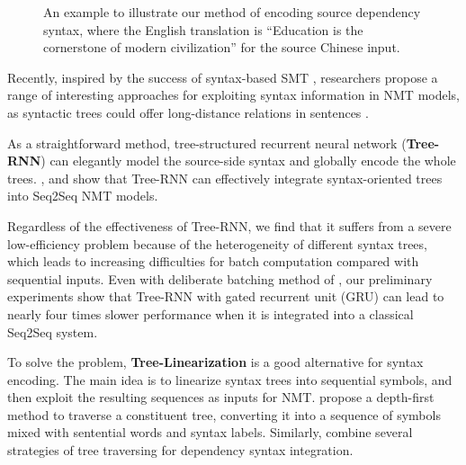 \documentclass[11pt,a4paper]{article}
\begin{document}
\begin{CJK}{UTF8}{gbsn}
\begin{figure}[tb]
	\begin{center}
		\caption{An example to illustrate our method of encoding source dependency syntax, where the English translation is ``Education is the cornerstone of modern civilization'' for the source Chinese input.}\label{fig:overall:method}
	\end{center}
\end{figure}

Recently, inspired by the success of syntax-based SMT \cite{williams2016syntax},
researchers propose a range of interesting approaches for exploiting syntax information in NMT models,
as syntactic trees could offer long-distance relations in sentences
\cite{shi-padhi-knight:2016:EMNLP2016,wu2017improved,li-EtAl:2017:Long,bastings-EtAl:2017:EMNLP2017,hashimoto-tsuruoka:2017:EMNLP2017}.




As a straightforward method, tree-structured recurrent neural network (\textbf{Tree-RNN})
can elegantly model the source-side syntax and globally encode the whole trees. ,  and 
show that Tree-RNN can effectively integrate syntax-oriented trees into Seq2Seq NMT models.   

Regardless of the effectiveness of Tree-RNN,
we find that it suffers from a severe low-efficiency problem
because of the heterogeneity of different syntax trees,
which leads to increasing difficulties for batch computation
compared with sequential inputs.
Even with deliberate batching method of ,
our preliminary experiments show that Tree-RNN
with gated recurrent unit (GRU) can lead to nearly four times slower performance
when it is integrated into a classical Seq2Seq system. 

To solve the problem, \textbf{Tree-Linearization} is a good alternative for syntax encoding.
The main idea is to linearize syntax trees into sequential symbols,
and then exploit the resulting sequences as inputs for NMT.
 propose a depth-first method to traverse a constituent tree,
converting it into a sequence of symbols mixed with sentential words and syntax labels.
Similarly,  combine several strategies of tree traversing for dependency syntax integration.




\end{CJK}
\end{document}
